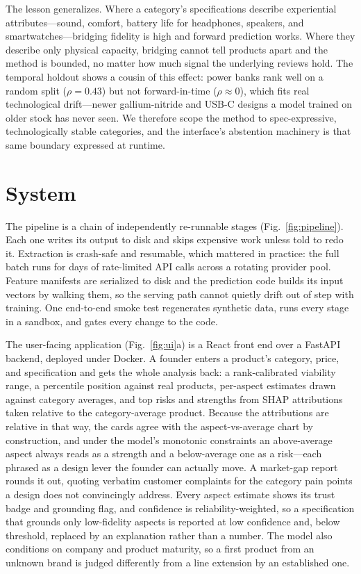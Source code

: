\documentclass[journal]{IEEEtran}
\begin{document}
The lesson generalizes. Where a category's specifications describe experiential attributes---sound, comfort, battery life for headphones, speakers, and smartwatches---bridging fidelity is high and forward prediction works. Where they describe only physical capacity, bridging cannot tell products apart and the method is bounded, no matter how much signal the underlying reviews hold. The temporal holdout shows a cousin of this effect: power banks rank well on a random split ($\rho = 0.43$) but not forward-in-time ($\rho \approx 0$), which fits real technological drift---newer gallium-nitride and USB-C designs a model trained on older stock has never seen. We therefore scope the method to spec-expressive, technologically stable categories, and the interface's abstention machinery is that same boundary expressed at runtime.

\section{System}
\label{sec:system}
The pipeline is a chain of independently re-runnable stages (Fig.~\ref{fig:pipeline}). Each one writes its output to disk and skips expensive work unless told to redo it. Extraction is crash-safe and resumable, which mattered in practice: the full batch runs for days of rate-limited API calls across a rotating provider pool. Feature manifests are serialized to disk and the prediction code builds its input vectors by walking them, so the serving path cannot quietly drift out of step with training. One end-to-end smoke test regenerates synthetic data, runs every stage in a sandbox, and gates every change to the code.

The user-facing application (Fig.~\ref{fig:ui}a) is a React front end over a FastAPI backend, deployed under Docker. A founder enters a product's category, price, and specification and gets the whole analysis back: a rank-calibrated viability range, a percentile position against real products, per-aspect estimates drawn against category averages, and top risks and strengths from SHAP \cite{lundberg2017shap} attributions taken relative to the category-average product. Because the attributions are relative in that way, the cards agree with the aspect-vs-average chart by construction, and under the model's monotonic constraints an above-average aspect always reads as a strength and a below-average one as a risk---each phrased as a design lever the founder can actually move. A market-gap report rounds it out, quoting verbatim customer complaints for the category pain points a design does not convincingly address. Every aspect estimate shows its trust badge and grounding flag, and confidence is reliability-weighted, so a specification that grounds only low-fidelity aspects is reported at low confidence and, below threshold, replaced by an explanation rather than a number. The model also conditions on company and product maturity, so a first product from an unknown brand is judged differently from a line extension by an established one.
\end{document}
